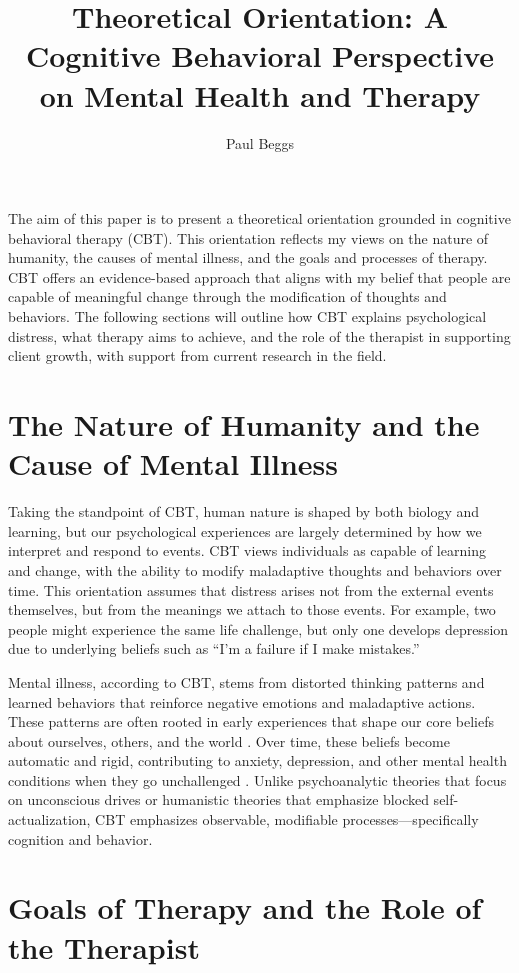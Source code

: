 \documentclass[stu]{apa7}
\title{Theoretical Orientation: A Cognitive Behavioral Perspective on Mental Health and Therapy}
\author{Paul Beggs}
\begin{document}
\maketitle


The aim of this paper is to present a theoretical orientation grounded in cognitive behavioral therapy (CBT). This orientation reflects my views on the nature of humanity, the causes of mental illness, and the goals and processes of therapy. CBT offers an evidence-based approach that aligns with my belief that people are capable of meaningful change through the modification of thoughts and behaviors. The following sections will outline how CBT explains psychological distress, what therapy aims to achieve, and the role of the therapist in supporting client growth, with support from current research in the field.

\section{The Nature of Humanity and the Cause of Mental Illness}

Taking the standpoint of CBT, human nature is shaped by both biology and learning, but our psychological experiences are largely determined by how we interpret and respond to events. CBT views individuals as capable of learning and change, with the ability to modify maladaptive thoughts and behaviors over time. This orientation assumes that distress arises not from the external events themselves, but from the meanings we attach to those events. For example, two people might experience the same life challenge, but only one develops depression due to underlying beliefs such as ``I'm a failure if I make mistakes.''

Mental illness, according to CBT, stems from distorted thinking patterns and learned behaviors that reinforce negative emotions and maladaptive actions. These patterns are often rooted in early experiences that shape our core beliefs about ourselves, others, and the world \parencite{clark2011cognitive}. Over time, these beliefs become automatic and rigid, contributing to anxiety, depression, and other mental health conditions when they go unchallenged \parencite{clark2011cognitive}. Unlike psychoanalytic theories that focus on unconscious drives or humanistic theories that emphasize blocked self-actualization, CBT emphasizes observable, modifiable processes—specifically cognition and behavior.

\section{Goals of Therapy and the Role of the Therapist}
\end{document}
